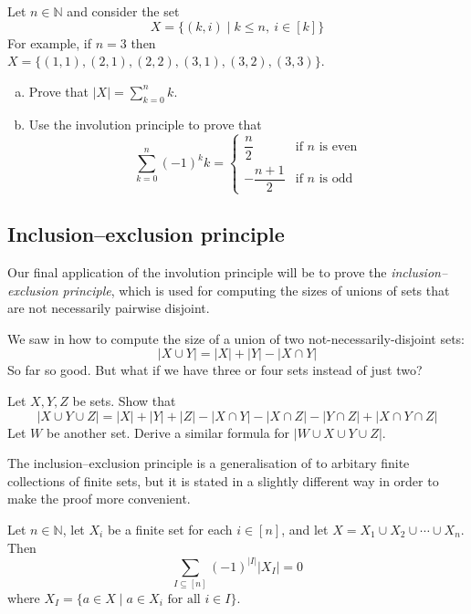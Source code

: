 \begin{exercise}
Let $n \in \mathbb{N}$ and consider the set
\[ X = \{ (k,i) \mid k \le n,~ i \in [k] \} \]
For example, if $n=3$ then $X = \{ (1,1), (2,1), (2,2), (3,1), (3,2), (3,3) \}$.

\begin{enumerate}[(a)]
\item Prove that $|X| = \displaystyle \sum_{k=0}^n k$.
\item Use the involution principle to prove that
\[ \sum_{k=0}^n (-1)^k k = \begin{cases} \dfrac{n}{2} & \text{if $n$ is even} \\ -\dfrac{n+1}{2} & \text{if $n$ is odd } \end{cases} \]
\end{enumerate}
\end{exercise}

\subsection*{Inclusion--exclusion principle}

Our final application of the involution principle will be to prove the \textit{inclusion--exclusion principle}, which is used for computing the sizes of unions of sets that are not necessarily pairwise disjoint.

We saw in  how to compute the size of a union of two not-necessarily-disjoint sets:
\[ |X \cup Y| = |X| + |Y| - |X \cap Y| \]
So far so good. But what if we have three or four sets instead of just two?

\begin{exercise}
\label{exSizeOfUnionOf3Or4Sets}
Let $X,Y,Z$ be sets. Show that
\[ |X \cup Y \cup Z| = |X| + |Y| + |Z| - |X \cap Y| - |X \cap Z| - |Y \cap Z| + |X \cap Y \cap Z| \]
Let $W$ be another set. Derive a similar formula for $|W \cup X \cup Y \cup Z|$.
\end{exercise}

The inclusion--exclusion principle is a generalisation of  to arbitary finite collections of finite sets, but it is stated in a slightly different way in order to make the proof more convenient.

\begin{theorem}
\label{thmInclusionExclusion}
Let $n \in \mathbb{N}$, let $X_i$ be a finite set for each $i \in [n]$, and let $X = X_1 \cup X_2 \cup \cdots \cup X_n$. Then
\[ \sum_{I \subseteq [n]} (-1)^{|I|} |X_I| = 0 \]
where $X_I = \{ a \in X \mid a \in X_i \text{ for all } i \in I \}$. 
\end{theorem}

